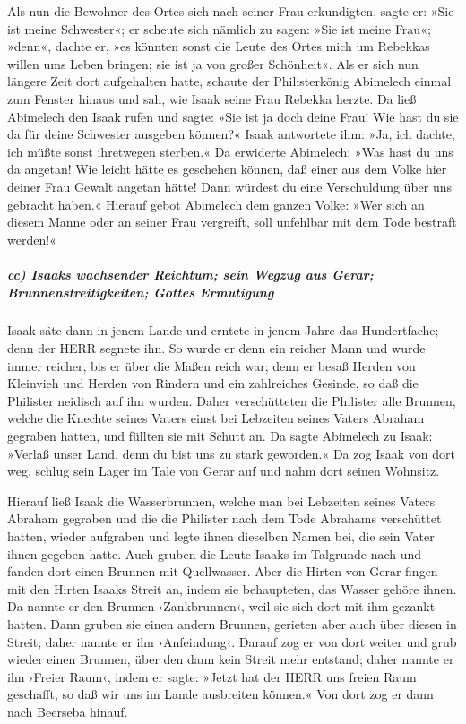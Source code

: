  Als nun die Bewohner des Ortes sich nach seiner Frau
erkundigten, sagte er: »Sie ist meine Schwester«; er scheute sich
nämlich zu sagen: »Sie ist meine Frau«; »denn«, dachte er, »es könnten
sonst die Leute des Ortes mich um Rebekkas willen ums Leben bringen; sie
ist ja von großer Schönheit«.  Als er sich nun längere
Zeit dort aufgehalten hatte, schaute der Philisterkönig Abimelech einmal
zum Fenster hinaus und sah, wie Isaak seine Frau Rebekka herzte.
 Da ließ Abimelech den Isaak rufen und sagte: »Sie ist ja
doch deine Frau! Wie hast du sie da für deine Schwester ausgeben
können?« Isaak antwortete ihm: »Ja, ich dachte, ich müßte sonst
ihretwegen sterben.«  Da erwiderte Abimelech: »Was hast
du uns da angetan! Wie leicht hätte es geschehen können, daß einer aus
dem Volke hier deiner Frau Gewalt angetan hätte! Dann würdest du eine
Verschuldung über uns gebracht haben.«  Hierauf gebot
Abimelech dem ganzen Volke: »Wer sich an diesem Manne oder an seiner
Frau vergreift, soll unfehlbar mit dem Tode bestraft werden!«

\hypertarget{cc-isaaks-wachsender-reichtum-sein-wegzug-aus-gerar-brunnenstreitigkeiten-gottes-ermutigung}{%
\subparagraph{cc) Isaaks wachsender Reichtum; sein Wegzug aus Gerar;
Brunnenstreitigkeiten; Gottes
Ermutigung}\label{cc-isaaks-wachsender-reichtum-sein-wegzug-aus-gerar-brunnenstreitigkeiten-gottes-ermutigung}}

 Isaak säte dann in jenem Lande und erntete in jenem
Jahre das Hundertfache; denn der HERR segnete ihn.  So
wurde er denn ein reicher Mann und wurde immer reicher, bis er über die
Maßen reich war;  denn er besaß Herden von Kleinvieh und
Herden von Rindern und ein zahlreiches Gesinde, so daß die Philister
neidisch auf ihn wurden.  Daher verschütteten die
Philister alle Brunnen, welche die Knechte seines Vaters einst bei
Lebzeiten seines Vaters Abraham gegraben hatten, und füllten sie mit
Schutt an.  Da sagte Abimelech zu Isaak: »Verlaß unser
Land, denn du bist uns zu stark geworden.«  Da zog Isaak
von dort weg, schlug sein Lager im Tale von Gerar auf und nahm dort
seinen Wohnsitz.

 Hierauf ließ Isaak die Wasserbrunnen, welche man bei
Lebzeiten seines Vaters Abraham gegraben und die die Philister nach dem
Tode Abrahams verschüttet hatten, wieder aufgraben und legte ihnen
dieselben Namen bei, die sein Vater ihnen gegeben hatte. 
Auch gruben die Leute Isaaks im Talgrunde nach und fanden dort einen
Brunnen mit Quellwasser.  Aber die Hirten von Gerar
fingen mit den Hirten Isaaks Streit an, indem sie behaupteten, das
Wasser gehöre ihnen. Da nannte er den Brunnen ›Zankbrunnen‹, weil sie
sich dort mit ihm gezankt hatten.  Dann gruben sie einen
andern Brunnen, gerieten aber auch über diesen in Streit; daher nannte
er ihn ›Anfeindung‹.  Darauf zog er von dort weiter und
grub wieder einen Brunnen, über den dann kein Streit mehr entstand;
daher nannte er ihn ›Freier Raum‹, indem er sagte: »Jetzt hat der HERR
uns freien Raum geschafft, so daß wir uns im Lande ausbreiten können.«
 Von dort zog er dann nach Beerseba hinauf.

